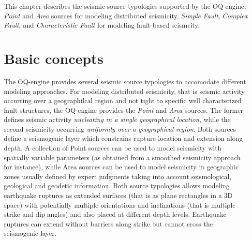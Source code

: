 This chapter describes the seismic source typologies supported by the OQ-engine: \textit{Point} and
\textit{Area} sources for modeling distributed seismicity, \textit{Simple Fault}, \textit{Complex Fault}, and
\textit{Characteristic Fault} for modeling fault-based seismcity.


\section{Basic concepts}
The OQ-engine provides several seismic source typologies to accomodate different modeling approaches. For modeling distributed seismicity, that is seismic activity occurring over a geographilcal region and not tight to
specific well characterized fault structures, the OQ-engine provides the \textit{Point} and \textit{Area} sources. The former defines seismic activity \textit{nucleating in a single geographical location}, while the second seismicity occurring \textit{uniformly over a geographical region}. Both sources define a seismogenic layer which constrains rupture location and extension along depth. A collection of Point sources can be used to model seismicity with spatially variable parameters (as obtained from a smoothed seismicity approach for instance), while Area sources can be used to model seismicity in geographic zones usually defined by expert judgments taking into account seismological, geological and geodetic information. Both source typologies
allows modeling earthquake ruptures as extended surfaces (that is as plane rectangles in a 3D space) with potentially multiple orientations and inclinations (that is multiple strike and dip angles) and also placed
at different depth levels. Earthquake ruptures can extend without barriers along strike but cannot cross the seismogenic layer.

